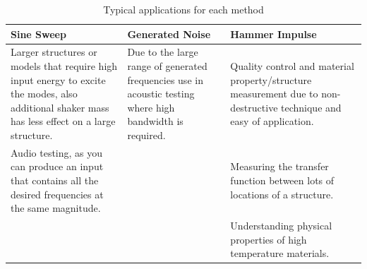 \documentclass[twoside,onecolumn]{article}
\begin{document}
\begin{table}[!htb]
\caption{Typical applications for each method}
\centering
\begin{tabular}{ p{46mm} | p{46mm} | p{46mm} }
Sine Sweep & Generated Noise & Hammer Impulse \\
\midrule
 Larger structures or models that require high input energy to excite the modes, also additional shaker mass has less effect on a large structure.& Due to the large range of generated frequencies use in acoustic testing where high bandwidth is required.& Quality control and material property/structure measurement due to non-destructive technique and easy of application.  \\
Audio testing, as you can produce an input that contains all the desired frequencies at the same magnitude.&& Measuring the transfer function between lots of locations of a structure. \\
&& Understanding physical properties of high temperature materials.\\
\end{tabular}
\label{table:uses}
\end{table}
\end{document}
